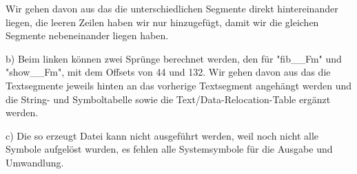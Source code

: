 \documentclass{ti2}
\begin{document}
\begin{minipage}{\linewidth}
\end{minipage}


Wir gehen davon aus das die unterschiedlichen Segmente direkt hintereinander liegen,
die leeren Zeilen haben wir nur hinzugefügt, damit wir die gleichen Segmente nebeneinander liegen haben.


b) Beim linken können zwei Sprünge berechnet werden, den für "fib\_\_Fm" und "show\_\_Fm", mit dem Offsets von 44 und 132.
Wir gehen davon aus das die Textsegmente jeweils hinten an das vorherige Textsegment angehängt werden
und die String- und Symboltabelle sowie die Text/Data-Relocation-Table ergänzt werden.

c) Die so erzeugt Datei kann nicht ausgeführt werden, weil noch nicht alle Symbole aufgelöst wurden, es fehlen alle Systemsymbole für die Ausgabe und Umwandlung.\\
\end{document}
